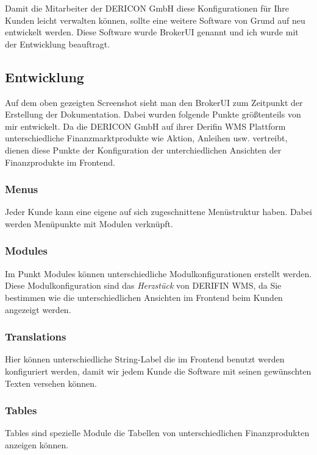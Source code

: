 \documentclass[chapterprefix=false, 12pt, a4paper, oneside, parskip=half, listof=totoc, bibliography=totoc, numbers=noendperiod]{scrbook}
\begin{document}
    Damit die Mitarbeiter der DERICON GmbH diese Konfigurationen für Ihre Kunden leicht verwalten können, sollte eine
    weitere Software von Grund auf neu entwickelt werden. Diese Software wurde BrokerUI genannt und ich wurde mit der
    Entwicklung beauftragt.

    \subsection{Entwicklung}

    Auf dem oben gezeigten Screenshot sieht man den BrokerUI zum Zeitpunkt der Erstellung der Dokumentation. Dabei wurden folgende
    Punkte größtenteils von mir entwickelt. Da die DERICON GmbH auf ihrer Derifin WMS Plattform unterschiedliche Finanzmarktprodukte
    wie Aktion, Anleihen usw. vertreibt, dienen diese Punkte der Konfiguration der unterchiedlichen Ansichten der Finanzprodukte im
    Frontend.

    \subsubsection{Menus}

    Jeder Kunde kann eine eigene auf sich zugeschnittene Menüstruktur haben.
    Dabei werden Menüpunkte mit Modulen verknüpft.

    \subsubsection{Modules}

    Im Punkt Modules können unterschiedliche Modulkonfigurationen erstellt werden. Diese Modulkonfiguration sind das \textit{Herzstück}
    von DERIFIN WMS, da Sie bestimmen wie die unterschiedlichen Ansichten im Frontend beim Kunden angezeigt werden.

    \subsubsection{Translations}

    Hier können unterschiedliche String-Label die im Frontend benutzt werden konfiguriert werden, damit wir jedem Kunde
    die Software mit seinen gewünschten Texten versehen können.

    \subsubsection{Tables}

    Tables sind spezielle Module die Tabellen von unterschiedlichen Finanzprodukten anzeigen können.
\end{document}
